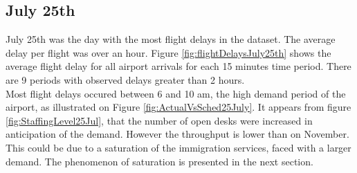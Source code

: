 \documentclass[11pt,onecolumn]{IEEEtran}
\begin{document}
\subsection{ July 25th}
July 25th was the day with the most flight delays in the dataset. The average delay per flight was over an hour.
Figure \ref{fig:flightDelaysJuly25th} shows the average flight delay for all airport arrivals for each 15 minutes time period. 
There are 9 periods with observed delays greater than 2 hours. \\

Most flight delays occured between 6 and 10 am, the high demand period of the airport, as illustrated on Figure \ref{fig:ActualVsSched25July}. 
It appears from figure \ref{fig:StaffingLevel25Jul}, that the number of open desks were increased in anticipation of the demand. However the throughput is lower than on November. This could be due to a saturation of the immigration services, faced with a larger demand. The phenomenon of saturation is presented in the next section.\\
\end{document}
